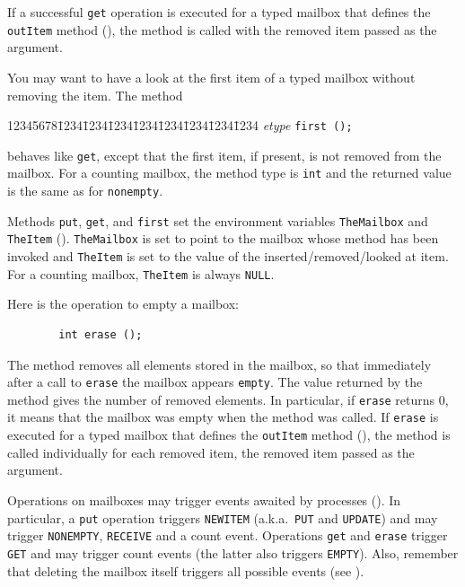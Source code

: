 If a successful
{\tt get} operation is executed for a typed mailbox that defines the
{\tt outItem} method (), the method is called
with the removed item passed as the argument.

You may want to have a look at the first item of a typed mailbox without
removing the item.
The method
{\tt\begin{tabbing}
12345678\=1234\=1234\=1234\=1234\=1234\=1234\=1234\=1234\kill
\> {\em etype\/} {\tt first (); }
\end{tabbing}}
behaves like {\tt get}, except that the first item, if present, is not
removed from the mailbox.
For a counting mailbox,
the method type is {\tt int} and the returned value is
the same as for {\tt nonempty}.

Methods {\tt put}, {\tt get}, and {\tt first} set the environment
variables {\tt TheMailbox} and {\tt TheItem} ().
{\tt TheMailbox} is set to point to the mailbox whose method has been
invoked and {\tt TheItem} is set to the value of the inserted/removed/looked at
item.
For a counting mailbox, {\tt TheItem} is always {\tt NULL}.

Here is the operation to empty a mailbox:
\begin{verbatim}
        int erase ();
\end{verbatim}
The method removes all elements stored in the mailbox, so that
immediately after a call to {\tt erase} the mailbox appears {\tt empty}.
The value returned by the method gives the number of removed elements.
In particular, if {\tt erase} returns 0, it means that the mailbox was
empty when the method was called.
If {\tt erase} is executed for a typed mailbox that defines the
{\tt outItem} method (), the method is called individually
for each removed item, the removed item passed as the argument.

Operations on mailboxes may trigger events awaited by processes
().
In particular, a {\tt put} operation triggers
{\tt NEWITEM} (a.k.a.~{\tt PUT} and {\tt UPDATE}) and may
trigger {\tt NONEMPTY}, {\tt RECEIVE} and a count event.
Operations {\tt get} and {\tt erase} trigger {\tt GET}
and may trigger count events (the latter also triggers {\tt EMPTY}).
Also, remember that deleting the mailbox itself triggers all possible events
(see ).

